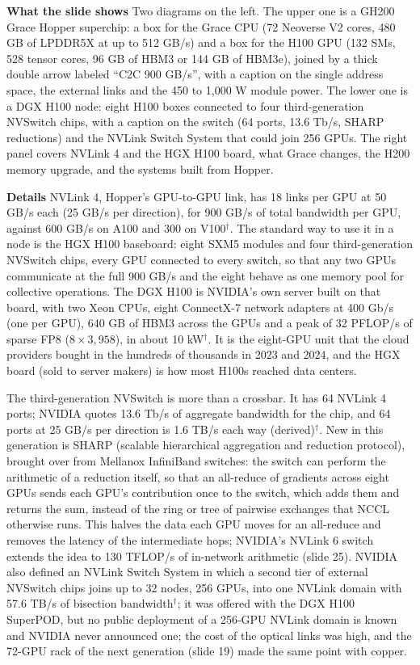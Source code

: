 \documentclass[11pt,letterpaper]{article}
\newcommand{\para}[1]{\medskip\noindent\textbf{#1}\quad}
\begin{document}
\para{What the slide shows} Two diagrams on the left. The upper one is a GH200 Grace Hopper superchip: a box for the Grace CPU (72 Neoverse V2 cores, 480 GB of LPDDR5X at up to 512 GB/s) and a box for the H100 GPU (132 SMs, 528 tensor cores, 96 GB of HBM3 or 144 GB of HBM3e), joined by a thick double arrow labeled ``C2C 900 GB/s'', with a caption on the single address space, the external links and the 450 to 1{,}000 W module power. The lower one is a DGX H100 node: eight H100 boxes connected to four third-generation NVSwitch chips, with a caption on the switch (64 ports, 13.6 Tb/s, SHARP reductions) and the NVLink Switch System that could join 256 GPUs. The right panel covers NVLink 4 and the HGX H100 board, what Grace changes, the H200 memory upgrade, and the systems built from Hopper.

\para{Details} NVLink 4, Hopper's GPU-to-GPU link, has 18 links per GPU at 50 GB/s each (25 GB/s per direction), for 900 GB/s of total bandwidth per GPU, against 600 GB/s on A100 and 300 on V100$^\dagger$. The standard way to use it in a node is the HGX H100 baseboard: eight SXM5 modules and four third-generation NVSwitch chips, every GPU connected to every switch, so that any two GPUs communicate at the full 900 GB/s and the eight behave as one memory pool for collective operations. The DGX H100 is NVIDIA's own server built on that board, with two Xeon CPUs, eight ConnectX-7 network adapters at 400 Gb/s (one per GPU), 640 GB of HBM3 across the GPUs and a peak of 32 PFLOP/s of sparse FP8 ($8\times3{,}958$), in about 10 kW$^\dagger$. It is the eight-GPU unit that the cloud providers bought in the hundreds of thousands in 2023 and 2024, and the HGX board (sold to server makers) is how most H100s reached data centers.

The third-generation NVSwitch is more than a crossbar. It has 64 NVLink 4 ports; NVIDIA quotes 13.6 Tb/s of aggregate bandwidth for the chip, and 64 ports at 25 GB/s per direction is 1.6 TB/s each way (derived)$^\dagger$. New in this generation is SHARP (scalable hierarchical aggregation and reduction protocol), brought over from Mellanox InfiniBand switches: the switch can perform the arithmetic of a reduction itself, so that an all-reduce of gradients across eight GPUs sends each GPU's contribution once to the switch, which adds them and returns the sum, instead of the ring or tree of pairwise exchanges that NCCL otherwise runs. This halves the data each GPU moves for an all-reduce and removes the latency of the intermediate hops; NVIDIA's NVLink 6 switch extends the idea to 130 TFLOP/s of in-network arithmetic (slide 25). NVIDIA also defined an NVLink Switch System in which a second tier of external NVSwitch chips joins up to 32 nodes, 256 GPUs, into one NVLink domain with 57.6 TB/s of bisection bandwidth$^\dagger$; it was offered with the DGX H100 SuperPOD, but no public deployment of a 256-GPU NVLink domain is known and NVIDIA never announced one; the cost of the optical links was high, and the 72-GPU rack of the next generation (slide 19) made the same point with copper.
\end{document}
